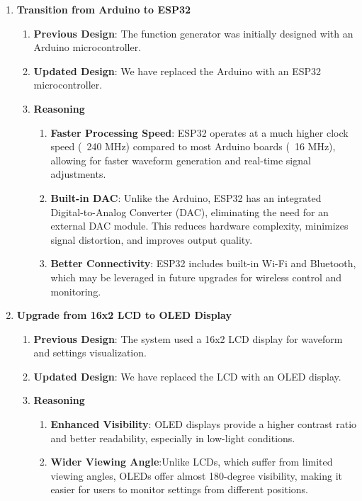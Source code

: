 \documentclass[12pt,a4paper]{article}
\begin{document}
\begin{enumerate}

\item \textbf{Transition from Arduino to ESP32}
\begin{enumerate}
\item \textbf{Previous Design}: The function generator was initially designed with an Arduino microcontroller. 
\item \textbf{Updated Design}: We have replaced the Arduino with an ESP32 microcontroller.
\item \textbf{Reasoning}
\begin{enumerate}
\item \textbf{Faster Processing Speed}: ESP32 operates at a much higher clock speed (~240 MHz) compared to most Arduino boards (~16 MHz), allowing for faster waveform generation and real-time signal adjustments.
\item \textbf{Built-in DAC}: Unlike the Arduino, ESP32 has an integrated Digital-to-Analog Converter (DAC), eliminating the need for an external DAC module. This reduces hardware complexity, minimizes signal distortion, and improves output quality.
\item \textbf{Better Connectivity}: ESP32 includes built-in Wi-Fi and Bluetooth, which may be leveraged in future upgrades for wireless control and monitoring.
\end{enumerate}

\end{enumerate}



\item \textbf{Upgrade from 16x2 LCD to OLED Display}
\begin{enumerate}
\item \textbf{Previous Design}: The system used a 16x2 LCD display for waveform and settings visualization.  
\item \textbf{Updated Design}: We have replaced the LCD with an OLED display.

\item \textbf{Reasoning}
\begin{enumerate}
\item \textbf{Enhanced Visibility}: OLED displays provide a higher contrast ratio and better readability, especially in low-light conditions.

\item \textbf{Wider Viewing Angle}:Unlike LCDs, which suffer from limited viewing angles, OLEDs offer almost 180-degree visibility, making it easier for users to monitor settings from different positions.


\end{enumerate}
\end{enumerate}
\end{enumerate}
\end{document}
